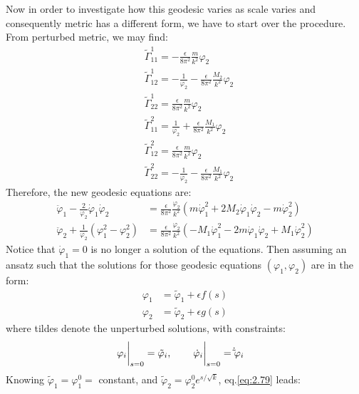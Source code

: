 Now in order to investigate how this geodesic varies as scale varies and consequently metric has a different form, we have to start over the procedure. From perturbed metric, we may find:
\begin{align}
    &\tilde \Gamma_{11}^{1} = -\frac{\epsilon}{8\pi^{2}} \frac{m}{k^2}\varphi_{2} \\
    &\tilde \Gamma _{12} ^{1} = -\frac{1}{\varphi_{2}} -\frac{\epsilon}{8\pi^{2}}\frac{M_2}{k^2}\varphi_{2} \\
    &\tilde \Gamma _{22}^{1} = \frac{\epsilon}{8\pi^{2}} \frac{m}{k^2} \varphi_{2} \\
    &\tilde \Gamma _{11} ^{2} = \frac{1}{\varphi_{2}} + \frac{\epsilon}{8\pi^{2}}\frac{M_{1}}{k^{2}}\varphi_{2}\\
    &\tilde \Gamma _{12} ^{2} = \frac{\epsilon}{8\pi ^{2}} \frac{m}{k^{2}}\varphi_{2} \\
    &\tilde \Gamma _{22} ^{2} = -\frac{1}{\varphi_{2}} -\frac{\epsilon}{8\pi^{2}}\frac{M_1}{k^{2}}\varphi_{2}
\end{align}
Therefore, the new geodesic equations are:
\begin{align}[left=\empheqlbrace]
    \label{eq:2.79}
    \ddot \varphi_{1} - \frac{2}{\varphi_{2}} \dot \varphi_{1} \dot \varphi_{2} &= \frac{\epsilon}{8\pi ^{2}} \frac{\varphi_{2}}{k^{2}} (m\dot\varphi_{1}^{2} + 2M_{2} \dot \varphi_{1} \dot \varphi_{2} - m\dot \varphi_{2}^{2} )\\
    \label{eq:2.80}
    \ddot \varphi_{2} +\frac{1}{\varphi_{2}} (\varphi_{1} ^{2} - \varphi_{2}^{2}) &= \frac{\epsilon}{8\pi ^{2}}\frac{\varphi_{2}}{k^{2}}(-M_{1} \dot \varphi_{1}^{2} - 2m \dot \varphi_{1} \dot \varphi_{2} + M_{1} \dot \varphi_{2} ^{2})
\end{align}
Notice that $\dot \varphi_{1} = 0$ is no longer a solution of the equations. Then assuming an ansatz such that the solutions for those geodesic equations $(\varphi_{1}, \varphi_{2})$ are in the form:
\begin{align}[left=\empheqlbrace]
    \varphi_{1} &= \tilde \varphi_{1} + \epsilon f(s) \\
    \varphi_{2} &= \tilde \varphi_{2} + \epsilon g(s) 
\end{align}
where tildes denote the unperturbed solutions, with constraints:
\begin{align}
    \eval{\varphi_{i} } _{s=0} = \tilde \varphi_{i} ,& \qq{} \eval{\dot \varphi_{i}} _{s=0} = \dot \tilde\varphi_{i} 
\end{align}
Knowing $\tilde \varphi_{1} = \varphi_{1}^{0} =$ constant, and $\tilde \varphi_{2} = \varphi_{2} ^{0} e^{s/\sqrt{k}}$, eq.\ref{eq:2.79} leads:
